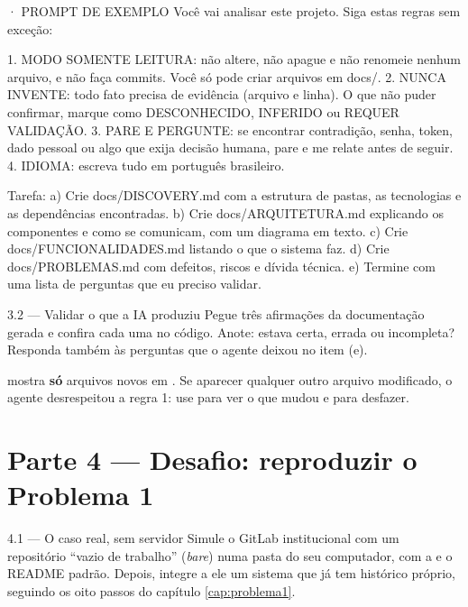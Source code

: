 \begin{terminalt}{· PROMPT DE EXEMPLO}
Você vai analisar este projeto. Siga estas regras sem exceção:

1. MODO SOMENTE LEITURA: não altere, não apague e não renomeie nenhum
   arquivo, e não faça commits. Você só pode criar arquivos em docs/.
2. NUNCA INVENTE: todo fato precisa de evidência (arquivo e linha).
   O que não puder confirmar, marque como DESCONHECIDO, INFERIDO ou
   REQUER VALIDAÇÃO.
3. PARE E PERGUNTE: se encontrar contradição, senha, token, dado pessoal
   ou algo que exija decisão humana, pare e me relate antes de seguir.
4. IDIOMA: escreva tudo em português brasileiro.

Tarefa:
a) Crie docs/DISCOVERY.md com a estrutura de pastas, as tecnologias e
   as dependências encontradas.
b) Crie docs/ARQUITETURA.md explicando os componentes e como se
   comunicam, com um diagrama em texto.
c) Crie docs/FUNCIONALIDADES.md listando o que o sistema faz.
d) Crie docs/PROBLEMAS.md com defeitos, riscos e dívida técnica.
e) Termine com uma lista de perguntas que eu preciso validar.
\end{terminalt}

\begin{exercicio}{3.2 — Validar o que a IA produziu}
Pegue três afirmações da documentação gerada e confira cada uma no código. Anote: estava certa, errada ou incompleta? Responda também às perguntas que o agente deixou no item (e).
\end{exercicio}

\begin{verifique}
 mostra \textbf{só} arquivos novos em . Se aparecer qualquer outro arquivo modificado, o agente desrespeitou a regra 1: use  para ver o que mudou e  para desfazer.
\end{verifique}

\section{Parte 4 — Desafio: reproduzir o Problema 1}

\begin{exercicio}{4.1 — O caso real, sem servidor}
Simule o GitLab institucional com um repositório \enquote{vazio de trabalho} (\emph{bare}) numa pasta do seu computador, com a  e o README padrão. Depois, integre a ele um sistema que já tem histórico próprio, seguindo os oito passos do capítulo \ref{cap:problema1}.
\end{exercicio}

